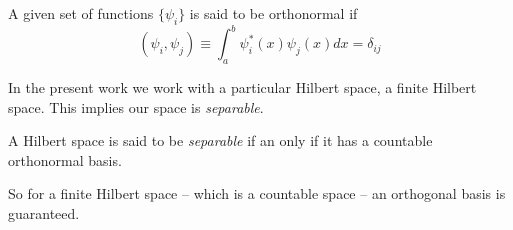 \begin{definition}[Orthonormality]
A given set of functions $\{\psi_{i}\}$ is said to be orthonormal if
\begin{equation}
    \left(\psi_{i}, \psi_{j}\right) \equiv \int_{a}^{b} \psi_{i}^{*}(x)\psi_{j}(x) dx = \delta_{ij} 
\end{equation}
\end{definition}
In the present work we work with a particular Hilbert space, a finite Hilbert space. This implies our space is \textit{separable}.
\begin{definition}[Separable]
    A Hilbert space is said to be \textit{separable} if an only if it has a countable orthonormal basis.
\end{definition}
So for a finite Hilbert space -- which is a countable space -- an orthogonal basis is guaranteed.
